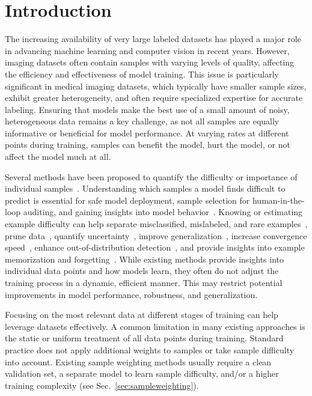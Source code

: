 \documentclass{article}
\theoremstyle{plain}
\theoremstyle{definition}
\theoremstyle{remark}
\begin{document}
\section{Introduction}
\label{sec:introduction}

The increasing availability of very large labeled datasets has played a major role in advancing machine learning and computer vision in recent years. However, imaging datasets often contain samples with varying levels of quality, affecting the efficiency and effectiveness of model training. This issue is particularly significant in medical imaging datasets, which typically have smaller sample sizes, exhibit greater heterogeneity, and often require specialized expertise for accurate labeling. Ensuring that models make the best use of a small amount of noisy, heterogeneous data remains a key challenge, as not all samples are equally informative or beneficial for model performance. At varying rates at different points during training, samples can benefit the model, hurt the model, or not affect the model much at all.

Several methods have been proposed to quantify the difficulty or importance of individual samples~\citep{agarwal_estimating_2022, paul2021deep, baldock2021deep, maini2022characterizing, siddiqui2022metadata, rabanser2022selective, toneva2018empirical, pliushch2022deep, xu_understanding_2021, kong_adaptive_2021, dong2023generalized, jiang2020characterizing, seedat_dissecting_2024}. Understanding which samples a model finds difficult to predict is essential for safe model deployment, sample selection for human-in-the-loop auditing, and gaining insights into model behavior~\citep{agarwal_estimating_2022}. Knowing or estimating example difficulty can help separate misclassified, mislabeled, and rare examples~\citep{maini2022characterizing}, prune data~\citep{paul2021deep}, quantify uncertainty~\citep{dong2023generalized}, improve generalization~\citep{xu_understanding_2021}, increase convergence speed~\citep{kong_adaptive_2021}, enhance out-of-distribution detection~\citep{agarwal_estimating_2022}, and provide insights into example memorization and forgetting~\citep{toneva2018empirical}. While existing methods provide insights into individual data points and how models learn, they often do not adjust the training process in a dynamic, efficient manner. This may restrict potential improvements in model performance, robustness, and generalization.

Focusing on the most relevant data at different stages of training can help leverage datasets effectively. A common limitation in many existing approaches is the static or uniform treatment of all data points during training. Standard practice does not apply additional weights to samples or take sample difficulty into account. Existing sample weighting methods usually require a clean validation set, a separate model to learn sample difficulty, and/or a higher training complexity (see Sec.~\ref{sec:sampleweighting}).
\end{document}
